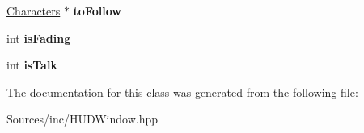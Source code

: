 \begin{DoxyCompactItemize}
\item 
\hypertarget{class_h_u_d_window_1_1_text_abf32e60e8e3b3cbef6263ad14a086137}{\hyperlink{class_characters}{Characters} $\ast$ {\bfseries to\+Follow}}\label{class_h_u_d_window_1_1_text_abf32e60e8e3b3cbef6263ad14a086137}

\item 
\hypertarget{class_h_u_d_window_1_1_text_a76043db43bebccb6913aff2a44f1af0f}{int {\bfseries is\+Fading}}\label{class_h_u_d_window_1_1_text_a76043db43bebccb6913aff2a44f1af0f}

\item 
\hypertarget{class_h_u_d_window_1_1_text_a4a83bfe4f3b1f4b8bf4930a0fcf292e2}{int {\bfseries is\+Talk}}\label{class_h_u_d_window_1_1_text_a4a83bfe4f3b1f4b8bf4930a0fcf292e2}

\end{DoxyCompactItemize}


The documentation for this class was generated from the following file\+:\begin{DoxyCompactItemize}
\item 
Sources/inc/H\+U\+D\+Window.\+hpp\end{DoxyCompactItemize}

